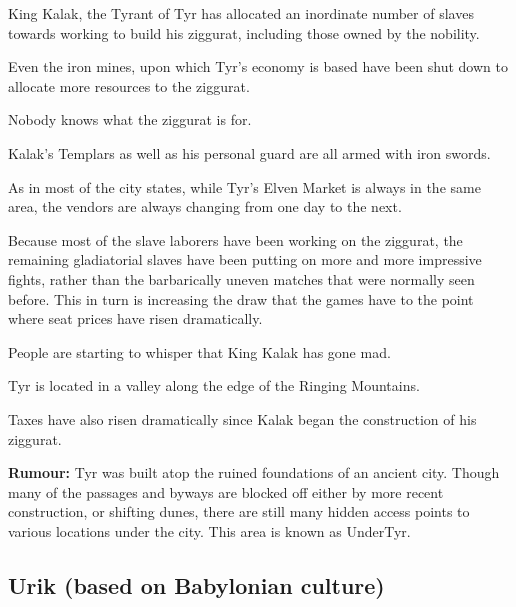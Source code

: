 \begin{multicols}{2}
\begin{description}
    \item King Kalak, the Tyrant of Tyr has allocated an inordinate number of slaves towards working to build his ziggurat, including those owned by the nobility.
    \item Even the iron mines, upon which Tyr’s economy is based have been shut down to allocate more resources to the ziggurat.
    \item Nobody knows what the ziggurat is for.
    \item Kalak’s Templars as well as his personal guard are all armed with iron swords.
    \item As in most of the city states, while Tyr’s Elven Market is always in the same area, the vendors are always changing from one day to the next.
    \item Because most of the slave laborers have been working on the ziggurat, the remaining gladiatorial slaves have been putting on more and more impressive fights, rather than the barbarically uneven matches that were normally seen before. This in turn is increasing the draw that the games have to the point where seat prices have risen dramatically.
    \item People are starting to whisper that King Kalak has gone mad.
    \item Tyr is located in a valley along the edge of the Ringing Mountains.
    \item Taxes have also risen dramatically since Kalak began the construction of his ziggurat.
    \item \textbf{Rumour:} Tyr was built atop the ruined foundations of an ancient city. Though many of the passages and byways are blocked off either by more recent construction, or shifting dunes, there are still many hidden access points to various locations under the city. This area is known as UnderTyr.
\end{description}

\subsection{Urik (based on Babylonian culture)}


\end{multicols}
